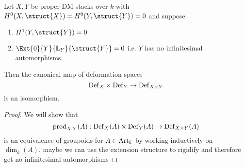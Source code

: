 \documentclass[12pt]{article}
\newcommand{\LL}{\mathbb{L}}
\begin{document}
\begin{prop}
Let $X,Y$ be proper DM-stacks over $k$ with $H^0(X, \struct{X}) = H^0(Y, \struct{Y}) = 0$ and suppose
\begin{enumerate}
\item $H^1(Y, \struct{Y}) = 0$
\item $\Ext{0}{Y}{\LL_Y}{\struct{Y}} = 0$ i.e. $Y$ has no infinitesimal automorphisms.
\end{enumerate}
Then the canonical map of deformation spaces
\[ \mathrm{Def}_X \times \mathrm{Def}_Y \to \mathrm{Def}_{X \times Y} \]
is an isomorphism.
\end{prop}

\begin{proof}
We will show that
\[ \mathrm{prod}_{X,Y}(A) : \mathrm{Def}_X(A) \times \mathrm{Def}_Y(A) \to \mathrm{Def}_{X \times Y}(A) \]
is an equivalence of groupoids for $A \in \mathrm{Art}_k$ by working inductively on $\dim_k(A)$. {\color{red} maybe we can use the extension structure to rigidify and therefore get no infinitesimal automorphisms}


\end{proof}
\end{document}
